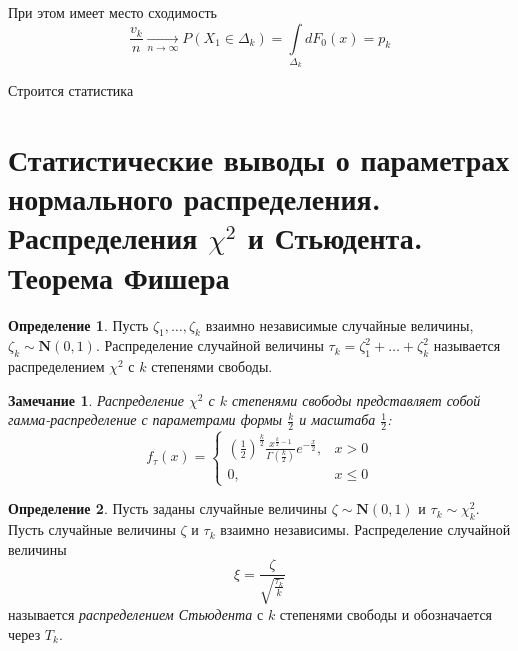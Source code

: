 \documentclass[oneside,final,14pt]{extreport}
\newtheorem*{rmrk}{Замечание}
\theoremstyle{definition}
\newtheorem{defn}{Определение}[section]
\begin{document}
При этом имеет место сходимость
\begin{equation*}
    \frac{v_k}{n} \xrightarrow[n \to \infty]{} P\left(X_{1} \in \Delta_{k}\right)=\int\limits_{\Delta_{k}} d F_{0}(x)=p_{k}
\end{equation*}

Строится статистика

\section{Статистические выводы о параметрах нормального распределения. Распределения $\chi^{2}$ и Стьюдента. Теорема Фишера}

\begin{defn}
    Пусть $\zeta_{1}, \ldots, \zeta_{k}$ взаимно независимые случайные величины, $\zeta_{k} \sim \mathbf{N}(0,1)$. Распределение случайной величины $\tau_{k}=\zeta_{1}^{2}+\ldots+\zeta_{k}^{2}$ называется распределением $\chi^{2}$ с $k$ степенями свободы.
\end{defn}
\begin{rmrk}
    Распределение $\chi^{2}$ с $k$ степенями свободы представляет собой гамма-распределение с параметрами формы $\frac{k}{2}$ и масштаба $\frac{1}{2}$:
    \begin{equation*}
    f_{\tau}(x)=\left\{\begin{array}{ll}
        \left(\frac{1}{2}\right)^{\frac{k}{2}} \frac{x^{\frac{k}{2}-1}}{\Gamma\left(\frac{k}{2}\right)} e^{-\frac{x}{2}}, & x>0 \\
        0, & x \leq 0
    \end{array}\right.
    \end{equation*}
\end{rmrk}

\begin{defn}
    Пусть заданы случайные величины $\zeta \sim \mathbf{N}(0,1)$ и $\tau_{k} \sim \chi_{k}^{2}$. Пусть случайные величины $\zeta$ и $\tau_{k}$ взаимно независимы. Распределение случайной величины 
    \begin{equation*}
        \xi=\frac{\zeta}{\sqrt{\frac{\tau_{k}}{k}}}
    \end{equation*}
    называется {\it распределением Стьюдента} с $k$ степенями свободы и обозначается через $T_{k}$.
\end{defn}
\end{document}
